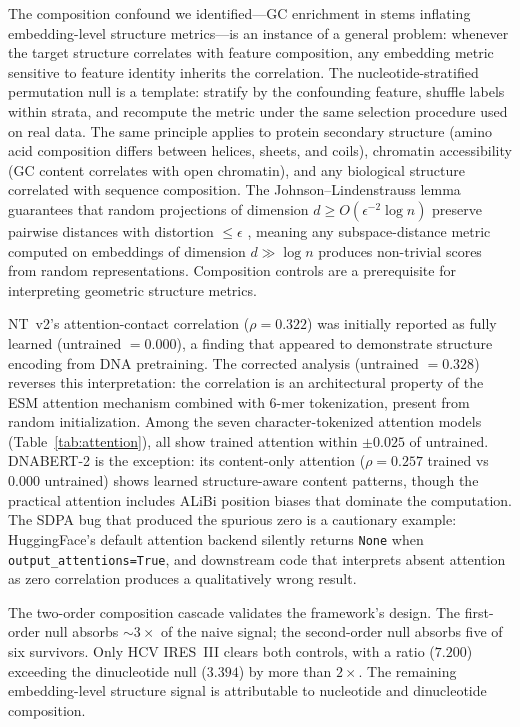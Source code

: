 \documentclass[11pt]{article}
\begin{document}
The composition confound we identified---GC enrichment in stems
inflating embedding-level structure metrics---is an instance of a
general problem: whenever the target structure correlates with feature
composition, any embedding metric sensitive to feature identity
inherits the correlation.  The nucleotide-stratified permutation null
is a template: stratify by the confounding feature, shuffle labels
within strata, and recompute the metric under the same selection
procedure used on real data.  The same principle applies to protein
secondary structure (amino acid composition differs between helices,
sheets, and coils), chromatin accessibility (GC content correlates
with open chromatin), and any biological structure correlated with
sequence composition.  The Johnson--Lindenstrauss lemma guarantees
that random projections of dimension $d \geq O(\epsilon^{-2} \log n)$
preserve pairwise distances with distortion $\leq \epsilon$
\citep{johnson1984extensions}, meaning any subspace-distance metric
computed on embeddings of dimension $d \gg \log n$ produces
non-trivial scores from random representations.  Composition controls
are a prerequisite for interpreting geometric structure metrics.

NT~v2's attention-contact correlation ($\rho = 0.322$) was initially
reported as fully learned (untrained $= 0.000$), a finding that
appeared to demonstrate structure encoding from DNA pretraining.  The
corrected analysis (untrained $= 0.328$) reverses this
interpretation: the correlation is an architectural property of the
ESM attention mechanism combined with 6-mer tokenization, present from
random initialization.  Among the seven character-tokenized attention
models (Table~\ref{tab:attention}), all show trained attention within
$\pm 0.025$ of untrained.  DNABERT-2 is the exception: its
content-only attention ($\rho = 0.257$ trained vs $0.000$ untrained)
shows learned structure-aware content patterns, though the practical
attention includes ALiBi position biases that dominate the
computation.  The SDPA bug that produced the spurious zero is a
cautionary example: HuggingFace's default attention backend silently
returns \texttt{None} when \texttt{output\_attentions=True}, and
downstream code that interprets absent attention as zero correlation
produces a qualitatively wrong result.

The two-order composition cascade validates the framework's design.
The first-order null absorbs ${\sim}3\times$ of the naive signal; the
second-order null absorbs five of six survivors.  Only HCV IRES~III
clears both controls, with a ratio ($7.200$) exceeding the
dinucleotide null ($3.394$) by more than $2\times$.  The remaining
embedding-level structure signal is attributable to nucleotide and
dinucleotide composition.
\end{document}

